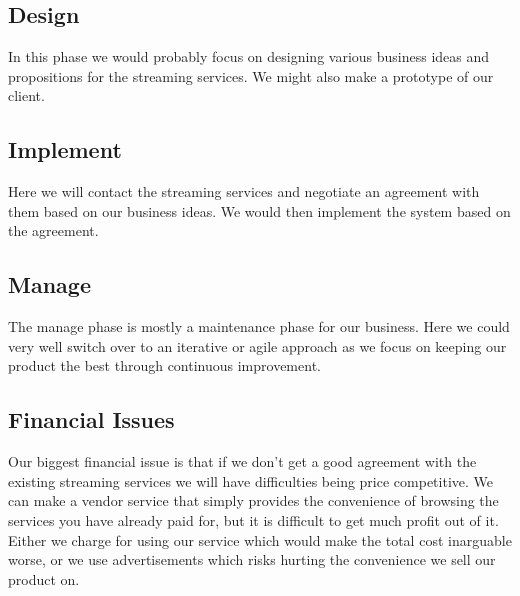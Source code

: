 \subsection{Design}
In this phase we would probably focus on designing various business ideas and propositions for the streaming services. We might also make a prototype of our client.

\subsection{Implement}
Here we will contact the streaming services and negotiate an agreement with them based on our business ideas. We would then implement the system based on the agreement.

\subsection{Manage}
The manage phase is mostly a maintenance phase for our business. Here we could very well switch over to an iterative or agile approach as we focus on keeping our product the best through continuous improvement.

\subsection{Financial Issues}
Our biggest financial issue is that if we don't get a good agreement with the existing streaming services we will have difficulties being price competitive. We can make a vendor service that simply provides the convenience of browsing the services you have already paid for, but it is difficult to get much profit out of it. Either we charge for using our service which would make the total cost inarguable worse, or we use advertisements which risks hurting the convenience we sell our product on.